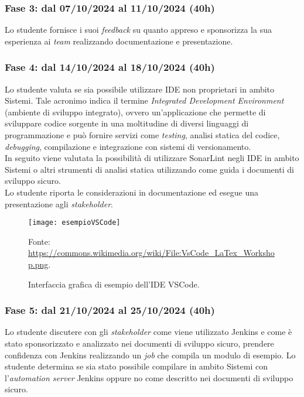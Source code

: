 \subsubsection*{Fase 3: dal 07/10/2024 al 11/10/2024 (40h) }
Lo studente fornisce i suoi \emph{feedback} su quanto appreso e sponsorizza la sua esperienza ai \emph{team} realizzando documentazione e presentazione.\\

\subsubsection*{Fase 4: dal 14/10/2024 al 18/10/2024 (40h) }
Lo studente valuta se sia possibile utilizzare IDE non proprietari in ambito \gls{Sistemi}. Tale acronimo indica il termine \emph{Integrated Development Environment} (ambiente di sviluppo integrato), ovvero un'applicazione che permette di sviluppare codice sorgente in una moltitudine di diversi linguaggi di programmazione e può fornire servizi come \emph{testing}, analisi statica del codice, \emph{debugging}, compilazione e integrazione con sistemi di versionamento.\\ 
In seguito viene valutata la possibilità di utilizzare SonarLint negli IDE in ambito \gls{Sistemi} o altri strumenti di analisi statica utilizzando come guida i documenti di sviluppo sicuro.\\
Lo studente riporta le considerazioni in documentazione ed esegue una presentazione agli \emph{stakeholder}.\\ 
\begin{figure}[htbp] 
    \centering 
    \texttt{[image: esempioVSCode]}
    \caption{Interfaccia grafica di esempio dell'IDE VSCode.} 
    \label{fig:esempioVSCode}
    \vspace{1mm}
    Fonte: \url{https://commons.wikimedia.org/wiki/File:VsCode_LaTex_Workshop.png}.
\end{figure}
\subsubsection*{Fase 5: dal 21/10/2024 al 25/10/2024 (40h) }
Lo studente discutere con gli \emph{stakeholder} come viene utilizzato Jenkins e come è stato sponsorizzato e analizzato nei documenti di sviluppo sicuro, prendere confidenza con Jenkins realizzando un \emph{job} che compila un modulo di esempio. Lo studente determina se sia stato possibile compilare in ambito \gls{Sistemi} con l'\emph{automation server} Jenkins oppure no come descritto nei documenti di sviluppo sicuro.\\

